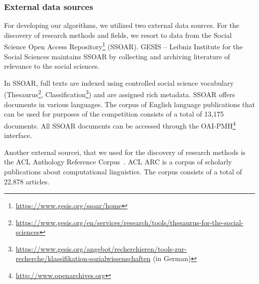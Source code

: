 \subsubsection{External data sources}
\label{sec:external_data_sources}
For developing our algorithms, we utilized two external data sources.
For the discovery of research methods and fields, we resort to data from the Social Science Open Access Repository\footnote{\url{https://www.gesis.org/ssoar/home}} (SSOAR). 
GESIS – Leibniz Institute for the Social Sciences maintains  SSOAR by collecting and archiving literature of relevance to the social sciences. 

In SSOAR, full texts are indexed using controlled social science vocabulary (Thesaurus\footnote{\url{https://www.gesis.org/en/services/research/tools/thesaurus-for-the-social-sciences}}, Classification\footnote{\url{https://www.gesis.org/angebot/recherchieren/tools-zur-recherche/klassifikation-sozialwissenschaften} (in German)}) and are assigned rich metadata. SSOAR offers documents in various languages. The corpus of English language publications that can be used for purposes of the competition consists of a total of 13,175 documents. All SSOAR documents can be accessed through the OAI-PMH\footnote{{\url{http://www.openarchives.org}}} interface. 

Another external sourcei, that we used for the discovery of research methods is the ACL Anthology Reference Corpus~\cite{bird2008acl}. ACL ARC is a corpus of scholarly publications about computational linguistics.  
The corpus consists of a total of 22,878 articles.


